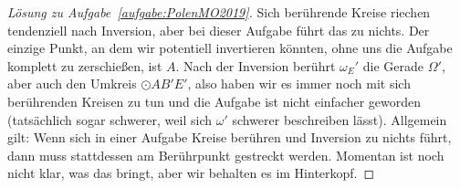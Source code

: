 \begin{proof}[Lösung zu Aufgabe~\ref{aufgabe:PolenMO2019}]
	Sich berührende Kreise riechen tendenziell nach Inversion, aber bei dieser Aufgabe führt das zu nichts. Der einzige Punkt, an dem wir potentiell invertieren könnten, ohne uns die Aufgabe komplett zu zerschießen, ist $A$. Nach der Inversion berührt $\omega_E'$ die Gerade $\Omega'$, aber auch den Umkreis $\odot AB'E'$, also haben wir es immer noch mit sich berührenden Kreisen zu tun und die Aufgabe ist nicht einfacher geworden (tatsächlich sogar schwerer, weil sich $\omega'$ schwerer beschreiben lässt). Allgemein gilt: Wenn sich in einer Aufgabe Kreise berühren und Inversion zu nichts führt, dann muss stattdessen am Berührpunkt gestreckt werden. Momentan ist noch nicht klar, was das bringt, aber wir behalten es im Hinterkopf.
	

\end{proof}
